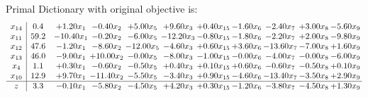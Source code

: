 \documentclass[9pt]{article}
\begin{document}
Primal Dictionary with original objective is:
\[\begin{array}{c| c c@{\hskip 2pt} c@{\hskip 2pt} c@{\hskip 2pt} c@{\hskip 2pt} c@{\hskip 2pt} c@{\hskip 2pt} c@{\hskip 2pt} c@{\hskip 2pt} c@{\hskip 2pt} }
 x_{14}   &  0.4 & +  1.20 x_{1} & -0.40 x_{2} & +  5.00 x_{5} & +  9.60 x_{3} & +  0.40 x_{15} & -1.60 x_{6} & -2.40 x_{7} & +  3.00 x_{8} & -5.60 x_{9}\\
 x_{11}   &  59.2 & -10.40 x_{1} & -0.20 x_{2} & -6.00 x_{5} & -12.20 x_{3} & -0.80 x_{15} & -1.80 x_{6} & -2.20 x_{7} & +  2.00 x_{8} & -9.80 x_{9}\\
 x_{12}   &  47.6 & -1.20 x_{1} & -8.60 x_{2} & -12.00 x_{5} & -4.60 x_{3} & +  0.60 x_{15} & +  3.60 x_{6} & -13.60 x_{7} & -7.00 x_{8} & +  1.60 x_{9}\\
 x_{13}   &  46.0 & -9.00 x_{1} & + 10.00 x_{2} & -0.00 x_{5} & -8.00 x_{3} & -1.00 x_{15} & -0.00 x_{6} & -4.00 x_{7} & -0.00 x_{8} & -6.00 x_{9}\\
 x_{4}   &  1.1 & +  0.30 x_{1} & -0.60 x_{2} & -0.50 x_{5} & +  0.40 x_{3} & +  0.10 x_{15} & +  0.60 x_{6} & -0.60 x_{7} & -0.50 x_{8} & +  0.10 x_{9}\\
 x_{10}   &  12.9 & +  9.70 x_{1} & -11.40 x_{2} & -5.50 x_{5} & -3.40 x_{3} & +  0.90 x_{15} & -4.60 x_{6} & -13.40 x_{7} & -3.50 x_{8} & +  2.90 x_{9}\\
\hline
z    &  3.3 & -0.10 x_{1} & -5.80 x_{2} & -4.50 x_{5} & +  4.20 x_{3} & +  0.30 x_{15} & -1.20 x_{6} & -3.80 x_{7} & -4.50 x_{8} & +  1.30 x_{9}\\
\end{array}\]
\end{document}
